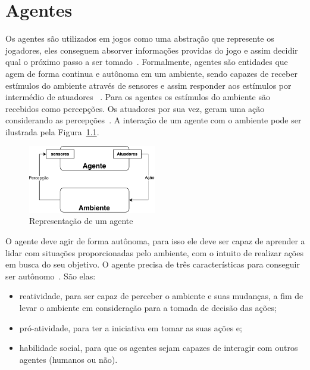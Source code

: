 \chapter{\label{chap:agentes}Agentes} 

Os agentes são utilizados em jogos como uma abstração que represente os jogadores, eles conseguem absorver informações providas do jogo e assim decidir qual o próximo passo a ser tomado~\cite{millington2009artificial}. 
Formalmente, agentes são entidades que agem de forma continua e autônoma em um ambiente, sendo capazes de receber estímulos do ambiente através de sensores e assim responder aos estímulos por intermédio de atuadores ~\cite{agent1993oriented}. 
Para os agentes os estímulos do ambiente são recebidos como percepções. 
Os atuadores por sua vez, geram uma ação considerando as percepções~\cite[Capítulo 7]{intelligence2003modern}. 
A interação de um agente com o ambiente pode ser ilustrada pela Figura~\ref{fig:agente}.

\begin{figure}[ht]
	\centering
	\includegraphics[width=0.5\textwidth]{fig/agente.pdf}
	\caption{Representação de um agente}
	\label{fig:agente}
\end{figure} 

O agente deve agir de forma autônoma, para isso ele deve ser capaz de aprender a lidar com situações proporcionadas pelo ambiente, com o intuito de realizar ações em busca do seu objetivo. O agente precisa de três características para conseguir ser autônomo~\cite{agent1999}. São elas:
 
\begin{itemize}
	\item reatividade, para ser capaz de perceber o ambiente e suas mudanças, a fim de levar o ambiente em consideração para a tomada de decisão das ações;
	\item pró-atividade, para ter a iniciativa em tomar as suas ações e;
	\item habilidade social, para que os agentes sejam capazes de interagir com outros agentes (humanos ou não).
\end{itemize}


